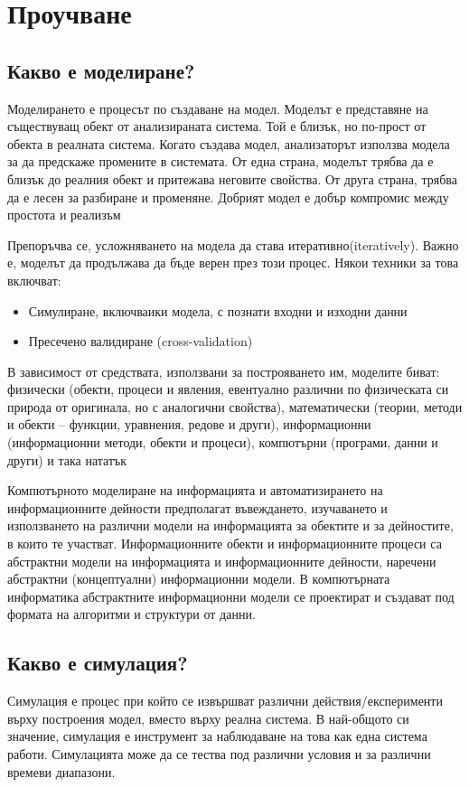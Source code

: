 \section{Проучване}
	\subsection{Какво е моделиране?}
		Моделирането е процесът по създаване на модел. Моделът е представяне на съществуващ обект 
		от анализираната система. Той е близък, но по-прост от обекта в реалната система.
		Когато създава модел, анализаторът използва модела за да предскаже промените в системата.
		От една страна, моделът трябва да е близък до реалния обект и притежава неговите свойства.
		От друга страна, трябва да е лесен за разбиране и променяне.
		Добрият модел е добър компромис между простота и реализъм \cite{Anu}
	
		Препоръчва се, усложняването на модела да става итеративно(iteratively). 
		Важно е, моделът да продължава да бъде верен през този процес. 
		Някои техники за това включват:
		\begin{itemize}
			\item Симулиране, включваики модела, с познати входни и изходни данни
			\item Пресечено валидиране (cross-validation) \cite{Mahoney}	
		\end{itemize}		 
		
		В зависимост от средствата, използвани за построяването им, моделите биват: физически
		(обекти, процеси и явления, евентуално различни по физическата си природа от оригинала,
		но с аналогични свойства), математически (теории, методи и обекти – функции, уравнения,
		редове и други), информационни (информационни методи, обекти и процеси), компютърни
		(програми, данни и други) и така нататък \cite{Totkov}
		
		Компютърното моделиране на информацията и автоматизирането на
		информационните дейности предполагат въвеждането, изучаването и използването на
		различни модели на информацията за обектите и за дейностите, в които те участват.
		Информационните обекти и информационните процеси са абстрактни модели на
		информацията и информационните дейности, наречени абстрактни (концептуални)
		информационни модели. В компютърната информатика абстрактните информационни
		модели се проектират и създават под формата на алгоритми и структури от данни. \cite{Totkov}
		
	\subsection{Какво е симулация?}
		Симулация е процес при който се извършват различни действия/експерименти върху построения модел, 
		вместо върху реална система. В най-общото си значение, симулация е инструмент за наблюдаване на това
		как една система работи. Симулацията може да се тества под различни условия и за различни времеви диапазони.
		
